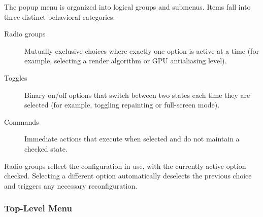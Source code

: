 The popup menu is organized into logical groups and submenus. Items fall into
three distinct behavioral categories:

\begin{description}
  \item[Radio groups] Mutually exclusive choices where exactly one option is
  active at a time (for example, selecting a render algorithm or GPU antialiasing level).
  \item[Toggles] Binary on/off options that switch between two states each time
  they are selected (for example, toggling repainting or full-screen mode).
  \item[Commands] Immediate actions that execute when selected and do not
  maintain a checked state.
\end{description}

Radio groups reflect the configuration in use, with the currently active option
checked. Selecting a different option automatically deselects the previous
choice and triggers any necessary reconfiguration.

\subsubsection{Top-Level Menu}

